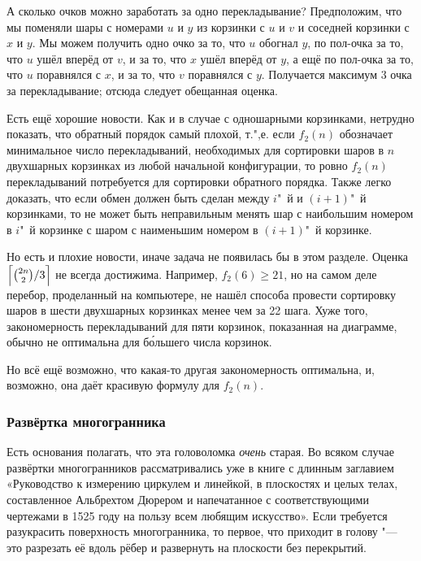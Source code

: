 \documentclass[twoside]{book}
\begin{document}
А сколько очков можно заработать за одно перекладывание?
Предположим, что мы поменяли шары с номерами $u$ и $y$ из корзинки с $u$ и $v$ и соседней корзинки с $x$ и $y$.
Мы можем получить одно очко за то, что $u$ обогнал $y$,
по пол-очка за то, что $u$ ушёл вперёд от $v$,
и за то, что $x$ ушёл вперёд от $y$,
а ещё по пол-очка за то, что $u$ поравнялся с $x$, 
и за то, что $v$ поравнялся с $y$.
Получается максимум 3 очка за перекладывание;
отсюда следует обещанная оценка.


Есть ещё хорошие новости.
Как и в случае с одношарными корзинками, нетрудно показать, что обратный порядок самый плохой, т.",е. если $f_2(n)$ обозначает минимальное число перекладываний, необходимых для сортировки шаров в $n$ двухшарных корзинках из любой начальной конфигурации, то ровно $f_2(n)$ перекладываний потребуется для сортировки обратного порядка.
Также легко доказать, что если обмен должен быть сделан между $i$"~й и $(i+1)$"~й корзинками, то не может быть неправильным менять шар с наибольшим номером в $i$"~й корзинке с шаром с наименьшим номером в $(i+1)$"~й корзинке.

Но есть и плохие новости, иначе задача не появилась бы в этом разделе.
Оценка $\Bigl\lceil\binom{2n}{2}/3\Bigr\rceil$ не всегда достижима.
Например,  $f_2(6)\ge 21$, но на самом деле перебор, проделанный на компьютере, не нашёл способа провести сортировку шаров в шести двухшарных корзинках менее чем за 22 шага.
Хуже того, закономерность перекладываний для пяти корзинок, показанная на диаграмме, обычно не оптимальна для б\'{о}льшего числа корзинок.

Но всё ещё возможно, что какая-то другая закономерность оптимальна, и, возможно, она даёт красивую формулу для $f_2(n)$.

\subsubsection*{Развёртка многогранника}

Есть основания полагать, что эта головоломка \emph{очень} старая. 
Во всяком случае развёртки многогранников рассматривались уже в книге с длинным заглавием «Руководство к измерению циркулем и линейкой, в плоскостях и целых телах, составленное Альбрехтом Дюрером и напечатанное с соответствующими чертежами в 1525 году на пользу всем любящим искусство».
Если требуется разукрасить поверхность многогранника, то первое, что приходит в голову "--- это разрезать её вдоль рёбер и развернуть на плоскости без перекрытий.
\end{document}
